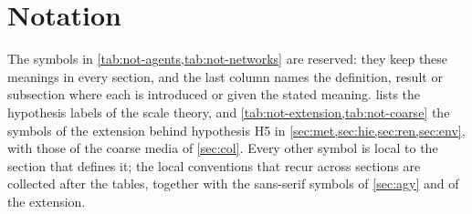 \section{Notation}\label{sec:not}

The symbols in \cref{tab:not-agents,tab:not-networks} are reserved: they keep these meanings in every section, and the last column names the definition, result or subsection where each is introduced or given the stated meaning.  lists the hypothesis labels of the scale theory, and \cref{tab:not-extension,tab:not-coarse} the symbols of the extension behind hypothesis H5 in \cref{sec:met,sec:hie,sec:ren,sec:env}, with those of the coarse media of \cref{sec:col}. Every other symbol is local to the section that defines it; the local conventions that recur across sections are collected after the tables, together with the sans-serif symbols of \cref{sec:agy} and of the extension.


